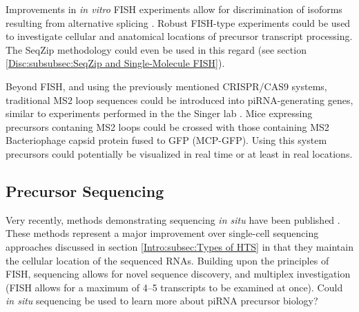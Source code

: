 
    Improvements in \textit{in vitro} FISH experiments allow for discrimination of isoforms resulting from alternative splicing \citep{Lee2014}. Robust FISH-type experiments could be used to investigate cellular and anatomical locations of  precursor transcript processing. The SeqZip methodology could even be used in this regard (see section \ref{Disc:subsubsec:SeqZip and Single-Molecule FISH}). 

    Beyond FISH, and using the previously mentioned CRISPR/CAS9 systems, traditional MS2 loop sequences could be introduced into piRNA-generating genes, similar to experiments performed in the the Singer lab \citep{Park2014}. Mice expressing precursors contaning MS2 loops could be crossed with those containing MS2 Bacteriophage capsid protein fused to GFP (MCP-GFP). Using this system precursors could potentially be visualized in real time or at least in real locations.

  \subsection{Precursor Sequencing}
    \label{Disc:subsec:Sequencing of Precursors}

    Very recently, methods demonstrating sequencing \textit{in situ} have been published \citep{Ke2013,Lee2014a}. These methods represent a major improvement over single-cell sequencing approaches discussed in section \ref{Intro:subsec:Types of HTS} in that they maintain the cellular location of the sequenced RNAs. Building upon the principles of FISH, sequencing allows for novel sequence discovery, and multiplex investigation (FISH allows for a maximum of 4--5 transcripts to be examined at once). Could \textit{in situ} sequencing be used to learn more about piRNA precursor biology?

